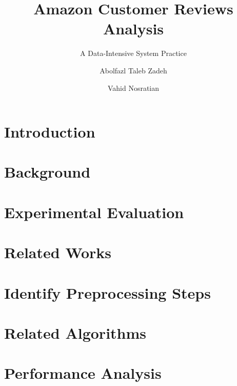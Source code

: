 \documentclass[sigconf]{acmart}
\begin{document}
\title{Amazon Customer Reviews Analysis}
\subtitle{A Data-Intensive System Practice}

\author{Abolfazl Taleb Zadeh}


\author{Vahid Nosratian}



\begin{abstract}

\end{abstract}


\maketitle


\section{Introduction}
\label{sec:introduction}


\section{Background}
\label{sec:background}


\section{Experimental Evaluation}
\label{sec:evaluation}


\section{Related Works}
\label{sec:relatedWorks}


\section{Identify Preprocessing Steps}
\label{sec:preprocessing}


\section{Related Algorithms}
\label{sec:relatedAlgorithms}


\section{Performance Analysis}
\label {sec:performance}





\end{document}
